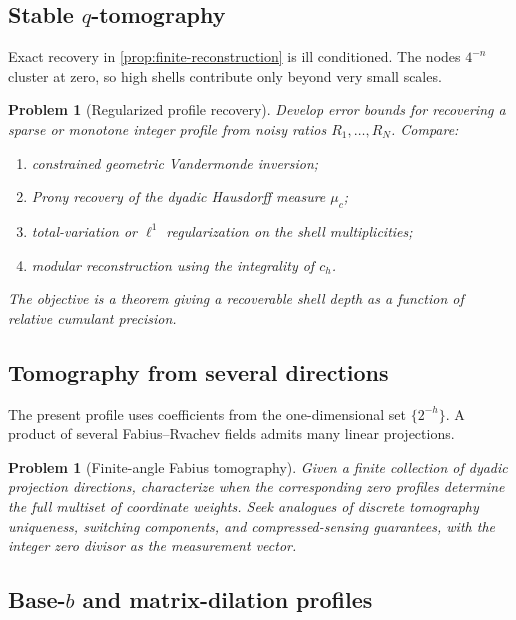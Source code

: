 \documentclass[11pt]{article}
\numberwithin{equation}{section}
\newtheorem{problem}[theorem]{Problem}
\theoremstyle{definition}
\theoremstyle{remark}
\begin{document}
\subsection{Stable $q$-tomography}

Exact recovery in \cref{prop:finite-reconstruction} is ill conditioned.  The
nodes $4^{-n}$ cluster at zero, so high shells contribute only beyond very
small scales.

\begin{problem}[Regularized profile recovery]
Develop error bounds for recovering a sparse or monotone integer profile from
noisy ratios $R_1,\ldots,R_N$.  Compare:
\begin{enumerate}[label=\textup{(\roman*)},leftmargin=*]
\item constrained geometric Vandermonde inversion;
\item Prony recovery of the dyadic Hausdorff measure $\mu_c$;
\item total-variation or $\ell^1$ regularization on the shell multiplicities;
\item modular reconstruction using the integrality of $c_h$.
\end{enumerate}
The objective is a theorem giving a recoverable shell depth as a function of
relative cumulant precision.
\end{problem}

\subsection{Tomography from several directions}

The present profile uses coefficients from the one-dimensional set
$\{2^{-h}\}$.  A product of several Fabius--Rvachev fields admits many linear
projections.

\begin{problem}[Finite-angle Fabius tomography]
Given a finite collection of dyadic projection directions, characterize when
the corresponding zero profiles determine the full multiset of coordinate
weights.  Seek analogues of discrete tomography uniqueness, switching
components, and compressed-sensing guarantees, with the integer zero divisor
as the measurement vector.
\end{problem}

\subsection{Base-$b$ and matrix-dilation profiles}
\end{document}
